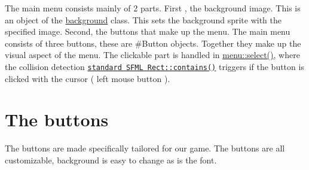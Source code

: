 The main menu consists mainly of 2 parts. First , the background image. This is an object of the \hyperlink{classbackground}{background} class. This sets the background sprite with the specified image. Second, the buttons that make up the menu. The main menu consists of three buttons, these are \#\+Button objects. Together they make up the visual aspect of the menu. The clickable part is handled in \hyperlink{classmenu_a06744d58a2aad693d3637d0485aa7984}{menu\+::select()}, where the collision detection \href{https://www.sfml-dev.org/documentation/2.0/classsf_1_1Rect.php#aa8a5364c84de6dd5299f833b54e31ef1 }{\tt standard S\+F\+ML Rect\+::contains()} triggers if the button is clicked with the cursor ( left mouse button ).\hypertarget{index_Button}{}\section{The buttons}\label{index_Button}
The buttons are made specifically tailored for our game. The buttons are all customizable, background is easy to change as is the font.

